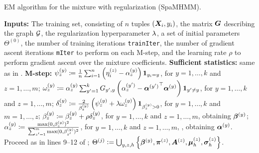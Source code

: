 \begin{algorithm}
	\caption{EM algorithm for the mixture with regularization (SpaMHMM).}
	\label{alg:spamhmm}
	\begin{algorithmic}[1]
		\State \textbf{Inputs:} The training set, consisting of $n$ tuples $({\bm{X}}_i,y_i)$, the matrix ${\bm{G}}$ describing the graph ${\mathcal{G}}$, the regularization hyperparameter $\lambda$, a set of initial parameters $\Theta^{(0)}$, the number of training iterations \texttt{trainIter}, the number of gradient ascent iterations \texttt{mIter} to perform on each M-step, and the learning rate $\rho$ to perform gradient ascent over the mixture coefficients.
		\vspace{0.3cm}
		\vspace{0.3cm}
		\State \textbf{Sufficient statistics:} same as in .
		\vspace{0.3cm}
		\State \textbf{M-step:}
		\vspace{0.3cm}
		\Indent
		\vspace{0.3cm}
			\State $\psi^{(y)}_{z} \coloneqq \frac{1}{n}\sum_{i=1}^n \left(\eta^{(z)}_i - {\alpha}^{(y)}_{z}\right) \bm{1}_{y_i=y}$, for $y=1,\dots,k$ and $z=1,\dots,m$;
			\vspace{0.3cm}
			\State $\omega^{(y)}_{z} \coloneqq {\alpha}^{(y)}_{z} \sum_{y'=1}^k {G}_{y',y}\left({\alpha}^{(y')}_{z} - {{\bm{\alpha}}^{(y')}} ^\top {\bm{\alpha}}^{(y)} \right) \bm{1}_{y' \neq y}$, for $y=1,\dots,k$ and $z=1,\dots,m$;
			\vspace{0.3cm}
			\State $\delta^{(y)}_z \coloneqq \frac{2}{{\beta}^{(y)}_{z}}\left(\psi^{(y)}_{z} + \lambda \omega^{(y)}_{z}\right) \bm{1}_{{\beta}^{(y)}_{z} > 0}$, for $y=1,\dots,k$ and $m=1,\dots,z$;
			\vspace{0.3cm}
			\State ${\beta}^{(y)}_{z} \coloneqq {\beta}^{(y)}_{z} + \rho \delta^{(y)}_z$, for $y=1,\dots,k$ and $z=1,\dots,m$, obtaining ${\bm{\beta}}^{(y)}$;
			\vspace{0.3cm}
			\State ${\alpha}^{(y)}_{z} \coloneqq \frac{\max(0, {\beta^{(y)}_z})^2}{\sum_{z'=1}^m \max(0, {\beta^{(y)}_{z'}})^2}$, for $y=1,\dots,k$ and $z=1,\dots,m$, , obtaining ${\bm{\alpha}}^{(y)}$.
			\vspace{0.3cm}
		\EndFor
		\vspace{0.3cm}
		\State Proceed as in lines 9--12 of ;
		\vspace{0.3cm}
		\State $\Theta^{(j)} := \bigcup_{y,z,h} \left\lbrace {\bm{\beta}}^{(y)}, {\bm{\pi}}^{(z)}, {\bm{A}}^{(z)}, {\bm{\mu}}^{(z)}_h, {\bm{\sigma}}^{(z)}_h \right\rbrace$.
		\vspace{0.3cm}
		\EndIndent
		\EndFor
	\end{algorithmic}
\end{algorithm}

